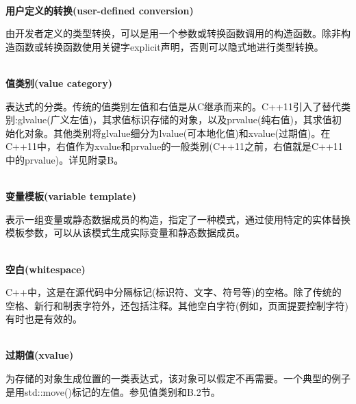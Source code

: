 \hspace*{\fill} \\ %
\noindent
\textbf{用户定义的转换(user-defined conversion)}

由开发者定义的类型转换，可以是用一个参数或转换函数调用的构造函数。除非构造函数或转换函数使用关键字explicit声明，否则可以隐式地进行类型转换。

\hspace*{\fill} \\ %
\noindent
\textbf{值类别(value category)}

表达式的分类。传统的值类别左值和右值是从C继承而来的。C++11引入了替代类别:glvalue(广义左值)，其求值标识存储的对象，以及prvalue(纯右值)，其求值初始化对象。其他类别将glvalue细分为lvalue(可本地化值)和xvalue(过期值)。在C++11中，右值作为xvalue和prvalue的一般类别(C++11之前，右值就是C++11中的prvalue)。详见附录B。

\hspace*{\fill} \\ %
\noindent
\textbf{变量模板(variable template)}

表示一组变量或静态数据成员的构造，指定了一种模式，通过使用特定的实体替换模板参数，可以从该模式生成实际变量和静态数据成员。

\hspace*{\fill} \\ %
\noindent
\textbf{空白(whitespace)}

C++中，这是在源代码中分隔标记(标识符、文字、符号等)的空格。除了传统的空格、新行和制表字符外，还包括注释。其他空白字符(例如，页面提要控制字符)有时也是有效的。

\hspace*{\fill} \\ %
\noindent
\textbf{过期值(xvalue)}

为存储的对象生成位置的一类表达式，该对象可以假定不再需要。一个典型的例子是用std::move()标记的左值。参见值类别和B.2节。




















